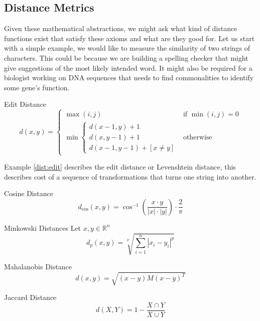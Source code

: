 \subsection{Distance Metrics}
Given these mathematical abstractions, we might ask what kind of distance functions exist that satisfy these axioms and what are they good for.  Let us start with a simple example, we would like to measure the similarity of two strings of characters.  This could be because we are building a spelling checker that might give suggestions of the most likely intended word.  It might also be required for a biologist working on DNA sequences that needs to find commonalities to identify some gene's function.
\begin{myexample}{Edit Distance}\label{dist:edit}
\[
d(x, y) = \begin{cases}
            \max(i,j) &\mbox{if } \min(i,j) = 0 \\
            \min \begin{cases} 
                d(x-1, y) + 1\\
                d(x, y-1) + 1\\
                d(x-1, y-1) + [x \neq y]
            \end{cases}&\mbox{otherwise} 
\end{cases}
\]
\end{myexample}
Example \ref{dist:edit} describes the edit distance or Levenshtein distance, this describes cost of a sequence of transformations that turns one string into another.
%
\begin{myexample}{Cosine Distance}
%
\[
  d_{\cos}(x,y) =  \cos^{-1}\left(\frac{x \cdot y}{|x| \cdot |y|}\right) \cdot \frac{2}{\pi} 
\]
\end{myexample}

%
\begin{myexample}{Minkowski Distances}
%
Let $x, y \in \mathbb{R}^n$ 
%
\[ 
  d_p(x, y) = \sqrt[p]{\sum_{i=1}^{n} | x_i - y_i |^p} 
\]
%
\end{myexample}

\begin{myexample}{Mahalanobis Distance}
%
\[ 
  d(x, y) = \sqrt{(x - y)M(x - y)^T} 
\]
\end{myexample}

%
\begin{myexample}{Jaccard Distance}
%
\[ 
  d(X,Y) = 1 - \frac{X \cap Y}{X \cup Y} 
\]
%
\end{myexample}

